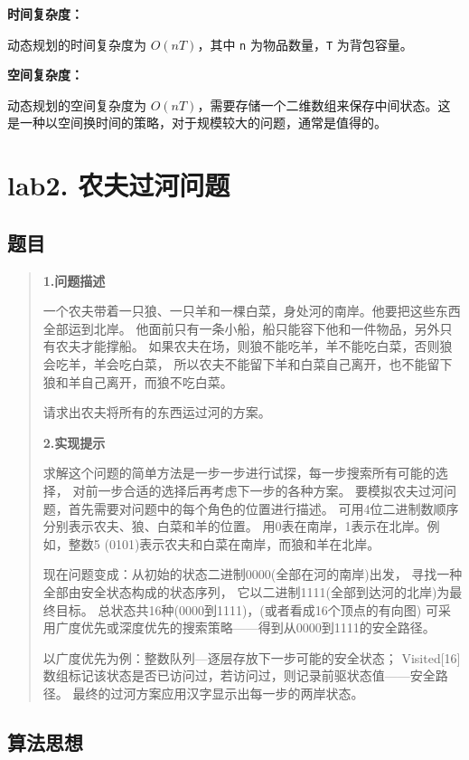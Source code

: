 \documentclass[UTF8]{ctexart}
\begin{document}
\textbf{时间复杂度：}

动态规划的时间复杂度为 $O(nT)$，其中 \texttt{n} 为物品数量，\texttt{T} 为背包容量。

\textbf{空间复杂度：}

动态规划的空间复杂度为 $O(nT)$，需要存储一个二维数组来保存中间状态。这是一种以空间换时间的策略，对于规模较大的问题，通常是值得的。




\newpage
\section*{lab2. 农夫过河问题}
\subsection*{题目}
\begin{abstract}
 
    \textbf{1.问题描述}

    一个农夫带着一只狼、一只羊和一棵白菜，身处河的南岸。他要把这些东西全部运到北岸。
    他面前只有一条小船，船只能容下他和一件物品，另外只有农夫才能撑船。
    如果农夫在场，则狼不能吃羊，羊不能吃白菜，否则狼会吃羊，羊会吃白菜，
    所以农夫不能留下羊和白菜自己离开，也不能留下狼和羊自己离开，而狼不吃白菜。

    请求出农夫将所有的东西运过河的方案。

    \textbf{2.实现提示}

    求解这个问题的简单方法是一步一步进行试探，每一步搜索所有可能的选择，
    对前一步合适的选择后再考虑下一步的各种方案。
    要模拟农夫过河问题，首先需要对问题中的每个角色的位置进行描述。
    可用4位二进制数顺序分别表示农夫、狼、白菜和羊的位置。
    用0表在南岸，1表示在北岸。例如，整数5 (0101)表示农夫和白菜在南岸，而狼和羊在北岸。

    现在问题变成：从初始的状态二进制0000(全部在河的南岸)出发，
    寻找一种全部由安全状态构成的状态序列，
    它以二进制1111(全部到达河的北岸)为最终目标。
    总状态共16种(0000到1111)，(或者看成16个顶点的有向图)
    可采用广度优先或深度优先的搜索策略——得到从0000到1111的安全路径。

    以广度优先为例：整数队列---逐层存放下一步可能的安全状态；
    Visited[16]数组标记该状态是否已访问过，若访问过，则记录前驱状态值——安全路径。
    最终的过河方案应用汉字显示出每一步的两岸状态。
\end{abstract}


\subsection*{算法思想}
\end{document}
